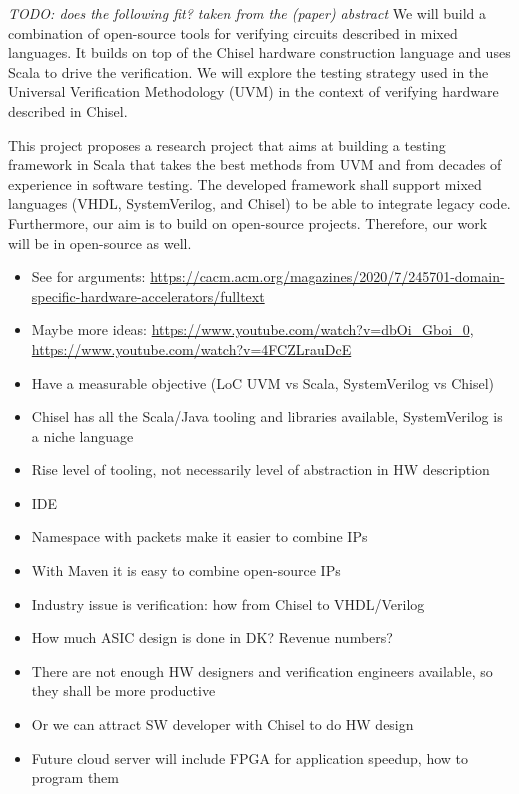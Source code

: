 \documentclass[fleqn,12pt]{article}
\newcommand{\todo}[1]{{\it TODO: #1}}
\begin{document}
\todo{does the following fit? taken from the (paper) abstract} 
We will build a combination of open-source tools for verifying
circuits described in mixed languages. It builds on top of the Chisel
hardware construction language and uses Scala to drive the verification. 
We will explore the testing strategy used in the Universal Verification Methodology
(UVM) in the context of verifying hardware described in Chisel.


This project proposes a research project that aims at building a testing framework
in Scala that takes the best methods from UVM and from decades of experience
in software testing.
The developed framework shall support mixed languages (VHDL, SystemVerilog, and Chisel)
to be able to integrate legacy code.
Furthermore, our aim is to build on open-source projects. Therefore, our
work will be in open-source as well.

\begin{itemize}
\item See for arguments: \url{https://cacm.acm.org/magazines/2020/7/245701-domain-specific-hardware-accelerators/fulltext}
\item Maybe more ideas: \url{https://www.youtube.com/watch?v=dbOi_Gboi_0}, \url{https://www.youtube.com/watch?v=4FCZLrauDcE}
\item Have a measurable objective (LoC UVM vs Scala, SystemVerilog vs Chisel)
\item Chisel has all the Scala/Java tooling and libraries available, SystemVerilog is a niche language
\item Rise level of tooling, not necessarily level of abstraction in HW description
\item IDE
\item Namespace with packets make it easier to combine IPs
\item With Maven it is easy to combine open-source IPs
\item Industry issue is verification: how from Chisel to VHDL/Verilog
\item How much ASIC design is done in DK? Revenue numbers?
\item There are not enough HW designers and verification engineers available, so they shall be more productive
\item Or we can attract SW developer with Chisel to do HW design
\item Future cloud server will include FPGA for application speedup, how to program them
\end{itemize}
\end{document}
